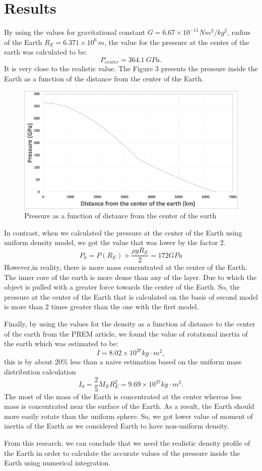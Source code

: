 \documentclass[12pt]{article}
\begin{document}
\section{Results}
By using the values for gravitational constant $G=6.67 \times 10^{-11} Nm^2/kg^2$, radius of the Earth $R_E=6.371 \times 10^6\, m$, the value for the pressure at the center of the earth was calculated to be:
\begin{equation}
P_{center}=364.1 \ GPa .
\end{equation}
It is very close to the realistic value. 
The Figure 3 presents the pressure inside the Earth as a function of the distance from the center of the Earth. 
\begin{figure}[H]
\centering
\includegraphics[width=1.0\textwidth]{pressure_calculated.jpg}\caption{Pressure as a function of distance from the center of the earth}
\end{figure}
In contrast, when we calculated the pressure at the center of the Earth using uniform density model, we got the value that was lower by the factor 2. 
\begin{equation}
P_0 = P(R_E) + \frac{\rho gR_E}{2} = 172 GPa
\end{equation}
However,in reality, there is more mass concentrated at the center of the Earth. The inner core of the earth is more dense than any of the layer. Due to which the object is pulled with a greater force towards the center of the Earth. So, the pressure at the center of the Earth that is calculated on the basis of second model is more than 2 times greater than the one with the first model.

Finally, by using the values for the density as a function of distance to the center of the earth from the PREM article, we found the value of rotational inertia of the earth which was estimated to be:
\begin{equation}
I=8.02 \times 10^{37} kg \cdot m^2,
\end{equation}
this is by about 20\% less than a naive estimation based on the uniform mass distribution calculation
\begin{equation}
I_0 = \frac{2}{5}M_{E} R^2_{E} = 9.69 \times 10^{37} kg \cdot m^2.
\end{equation}  
The most of the mass of the Earth is concentrated at the center whereas less mass is concentrated near the surface of the Earth. As a result, the Earth should more easily rotate than the uniform sphere. So, we got lower value of moment of inertia of the Earth as we considered Earth to have non-uniform density.

From this research, we can conclude that we need the realistic density profile of the Earth in order to calculate the accurate values of the pressure inside the Earth using numerical integration.
\end{document}
